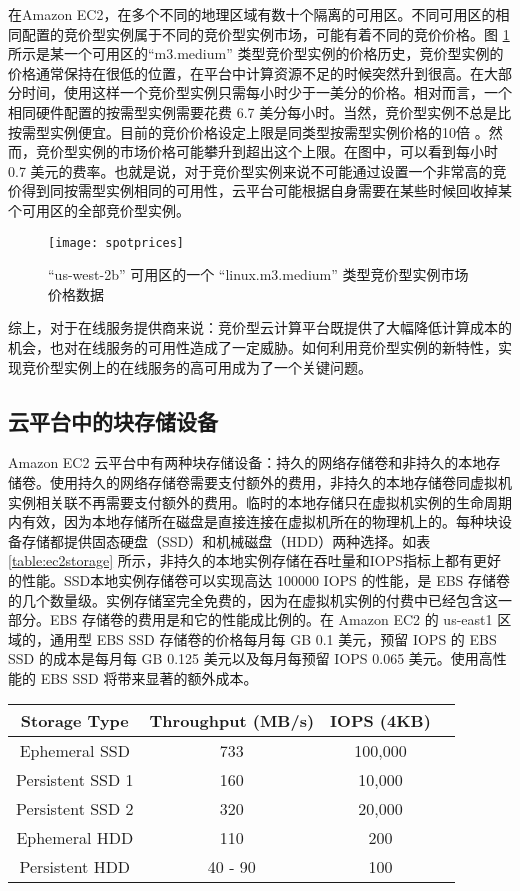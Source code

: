 在Amazon EC2，在多个不同的地理区域有数十个隔离的可用区。不同可用区的相同配置的竞价型实例属于不同的竞价型实例市场，可能有着不同的竞价价格。图 \ref{figure:sp} 所示是某一个可用区的``m3.medium'' 类型竞价型实例的价格历史，竞价型实例的价格通常保持在很低的位置，在平台中计算资源不足的时候突然升到很高。在大部分时间，使用这样一个竞价型实例只需每小时少于一美分的价格。相对而言，一个相同硬件配置的按需型实例需要花费 6.7 美分每小时。当然，竞价型实例不总是比按需型实例便宜。目前的竞价价格设定上限是同类型按需型实例价格的10倍 \cite{AWS_SL:2014}。然而，竞价型实例的市场价格可能攀升到超出这个上限。在图中，可以看到每小时 0.7 美元的费率。也就是说，对于竞价型实例来说不可能通过设置一个非常高的竞价得到同按需型实例相同的可用性，云平台可能根据自身需要在某些时候回收掉某个可用区的全部竞价型实例。
\begin{figure}[]
  \centering
  \texttt{[image: spotprices]}
  \caption{``us-west-2b'' 可用区的一个 ``linux.m3.medium'' 类型竞价型实例市场价格数据}
  \label{figure:sp}
\end{figure}

综上，对于在线服务提供商来说：竞价型云计算平台既提供了大幅降低计算成本的机会，也对在线服务的可用性造成了一定威胁。如何利用竞价型实例的新特性，实现竞价型实例上的在线服务的高可用成为了一个关键问题。

\subsection{云平台中的块存储设备}
Amazon EC2 云平台中有两种块存储设备：持久的网络存储卷和非持久的本地存储卷。使用持久的网络存储卷需要支付额外的费用，非持久的本地存储卷同虚拟机实例相关联不再需要支付额外的费用。临时的本地存储只在虚拟机实例的生命周期内有效，因为本地存储所在磁盘是直接连接在虚拟机所在的物理机上的。每种块设备存储都提供固态硬盘（SSD）和机械磁盘（HDD）两种选择。如表 \ref{table:ec2storage} 所示，非持久的本地实例存储在吞吐量和IOPS指标上都有更好的性能。SSD本地实例存储卷可以实现高达 100000 IOPS 的性能，是 EBS 存储卷的几个数量级。实例存储室完全免费的，因为在虚拟机实例的付费中已经包含这一部分。EBS 存储卷的费用是和它的性能成比例的。在 Amazon EC2 的 us-east1 区域的，通用型 EBS SSD 存储卷的价格每月每 GB 0.1 美元，预留 IOPS 的 EBS SSD 的成本是每月每 GB 0.125 美元以及每月每预留 IOPS 0.065 美元。使用高性能的 EBS SSD 将带来显著的额外成本。
\begin{table*}
\centering
\caption{Amazon EC2 Storage Performance Details}
\label{table:ec2storage}
\begin{tabular}{c|ccc} \hline
Storage Type& Throughput (MB/s)& IOPS (4KB)\\ \hline
Ephemeral SSD & 733 & 100,000\\ \hline
Persistent SSD 1 & 160 & 10,000\\ \hline
Persistent SSD 2 & 320 & 20,000\\ \hline
Ephemeral HDD & 110 & 200 \\ \hline
Persistent HDD & 40 - 90 & 100\\ \hline
\end{tabular}
\end{table*}

